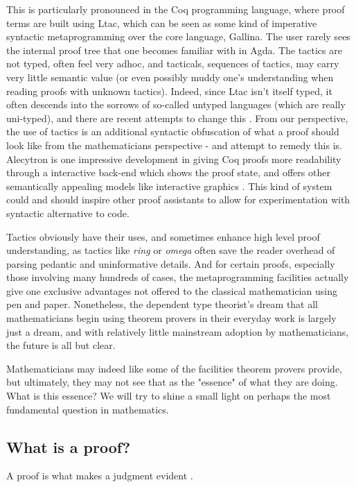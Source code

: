 This is particularly pronounced in the Coq programming language, where proof
terms are built using Ltac, which can be seen as some kind of imperative
syntactic metaprogramming over the core language, Gallina. The user rarely sees
the internal proof tree that one becomes familiar with in Agda. The tactics are
not typed, often feel very adhoc, and tacticals, sequences of tactics, may carry
very little semantic value (or even possibly muddy one's understanding when
reading proofs with unknown tactics). Indeed, since Ltac isn't itself typed, it
often descends into the sorrows of so-called untyped languages (which are really
uni-typed), and there are recent attempts to change this \cite{mtac2}
\cite{ltac2}. From our perspective, the use of tactics is an additional syntactic obfuscation
of what a proof should look like from the mathematicians perspective - and
attempt to remedy this is. Alecytron is one impressive development in giving Coq
proofs more readability through a interactive back-end which shows the proof
state, and offers other semantically appealing models like interactive graphics
\cite{coqAlec}. This kind of system could and should inspire other proof
assistants to allow for experimentation with syntactic alternative to code.

Tactics obviously have their uses, and sometimes enhance high level proof
understanding, as tactics like \emph{ring} or \emph{omega} often save the reader overhead
of parsing pedantic and uninformative details. And for certain proofs,
especially those involving many hundreds of cases, the metaprogramming
facilities actually give one exclusive advantages not offered to the classical
mathematician using pen and paper. Nonetheless, the dependent type theorist's
dream that all mathematicians begin using theorem provers in their everyday work
is largely just a dream, and with relatively little mainstream adoption by
mathematicians, the future is all but clear.

Mathematicians may indeed like some of the facilities theorem provers provide,
but ultimately, they may not see that as the "essence" of what they are doing.
What is this essence? We will try to shine a small light on perhaps the most
fundamental question in mathematics.

\subsection{What is a proof?}

\begin{displayquote}

A proof is what makes a judgment evident \cite{mlMeanings}.

\end{displayquote}

